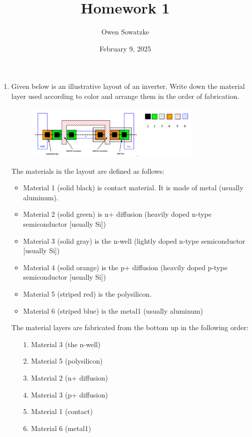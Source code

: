 \documentclass[fleqn]{article}
\title{Homework 1}
\author{Owen Sowatzke}
\date{February 9, 2025}
\newcommand{\zerodisplayskip}{
	\setlength{\abovedisplayskip}{0pt}%
	\setlength{\belowdisplayskip}{0pt}%
	\setlength{\abovedisplayshortskip}{0pt}%
	\setlength{\belowdisplayshortskip}{0pt}%
	\setlength{\mathindent}{0pt}}
\begin{document}
	\offinterlineskip
	\setlength{\lineskip}{12pt}
	\zerodisplayskip
	\maketitle
	
	\begin{enumerate}
		\item Given below is an illustrative layout of an inverter. Write down the material layer used according to color and arrange them in the order of fabrication.
		
		\begin{figure}[H]				
			\centerline{\includegraphics[width=0.8\textwidth]{inverter_layout.png}}
			\label{fig::inverter_layout}
		\end{figure}
		
		The materials in the layout are defined as follows:
		
		\begin{itemize}
			\item Material 1 (solid black) is contact material. It is made of metal (usually aluminum).
			\item Material 2 (solid green) is n+ diffusion (heavily doped n-type semiconductor [usually Si])
			\item Material 3 (solid gray) is the n-well (lightly doped n-type semiconductor [usually Si])
			\item Material 4 (solid orange) is the p+ diffusion (heavily doped p-type semiconductor [usually Si])
			\item Material 5 (striped red) is the polysilicon.
			\item Material 6 (striped blue) is the metal1 (usually aluminum)
		\end{itemize}
		
		The material layers are fabricated from the bottom up in the following order:
		
		\begin{enumerate}
			\item[1.] Material 3 (the n-well)
			\item[2.] Material 5 (polysilicon)
			\item[3.] Material 2 (n+ diffusion)
			\item[4.] Material 3 (p+ diffusion)
			\item[5.] Material 1 (contact)
			\item[6.] Material 6 (metal1)
		\end{enumerate}
		

\end{enumerate}
\end{document}
